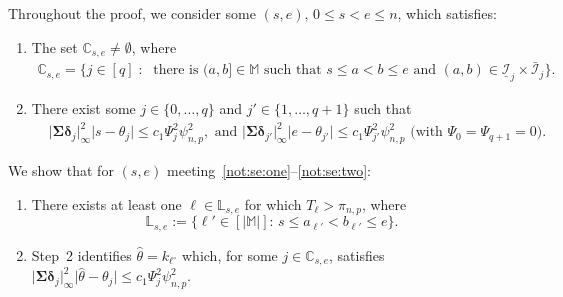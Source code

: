 \documentclass[11pt, a4paper]{article}
\newcommand{\mc}{\mathcal}
\def\wh{\widehat}
\newcommand{\cp}{\theta}
\theoremstyle{definition}
\theoremstyle{definition}
\theoremstyle{definition}
\theoremstyle{definition}
\theoremstyle{definition}
\theoremstyle{remark}
\theoremstyle{definition}
\theoremstyle{definition}
\theoremstyle{definition}
\begin{document}
Throughout the proof, we consider some $(s, e), \, 0 \le s < e \le n$, which satisfies:
\begin{enumerate}[label = (S\arabic*)]
	\item \label{not:se:one} The set $\mathbb{C}_{s, e} \ne \emptyset$, where 
	\begin{align*}
	\mathbb{C}_{s, e} = \bigl\{ j\in [q]\;:\;\text{ there is } (a, b] \in \mathbb{M} \text{ such that } s \le a < b \le e \text{ and } (a, b)\in \underline{\mc I}_j \times \bar{\mc I}_j\bigr\}.
	\end{align*}
	
	\item \label{not:se:two} There exist some $j \in \{0, \ldots, q\}$ and $j' \in \{1, \ldots, q + 1\}$ such that
	\begin{align*}
	& \vert \bm\Sigma \bm\delta_j \vert_\infty^2 \vert s - \cp_j \vert \le c_1 \Psi_j^2 \psi_{n, p}^2, \text{ \ and \ }
	\vert \bm\Sigma \bm\delta_{j'} \vert_\infty^2 \vert e - \cp_{j'} \vert \le c_1 \Psi_{j'}^2 \psi_{n, p}^2 \text{ \ (with $\Psi_0 = \Psi_{q + 1} = 0$).}
	\end{align*}
\end{enumerate}
We show that for $(s, e)$ meeting~\ref{not:se:one}--\ref{not:se:two}:
\begin{enumerate}[label = (R\arabic*)]
	\item \label{not:one} There exists at least one $\ell \in \mathbb{L}_{s, e}$ for which $T_\ell > \pi_{n, p}$, where 
	$$ \mathbb{L}_{s, e} := \{ \ell' \in [\vert \mathbb{M} \vert]: \, s \le a_{\ell'} < b_{\ell'} \le e\}. $$
	\item \label{not:two} Step~2 identifies $\wh\cp = k_{\ell^\circ}$ which, for some $j \in \mathbb{C}_{s, e}$, satisfies
	$\vert \bm\Sigma \bm\delta_j \vert_\infty^2 \vert \wh\cp - \cp_j \vert \le c_1 \Psi_j^2 \psi_{n, p}^2$.
\end{enumerate}
\end{document}
